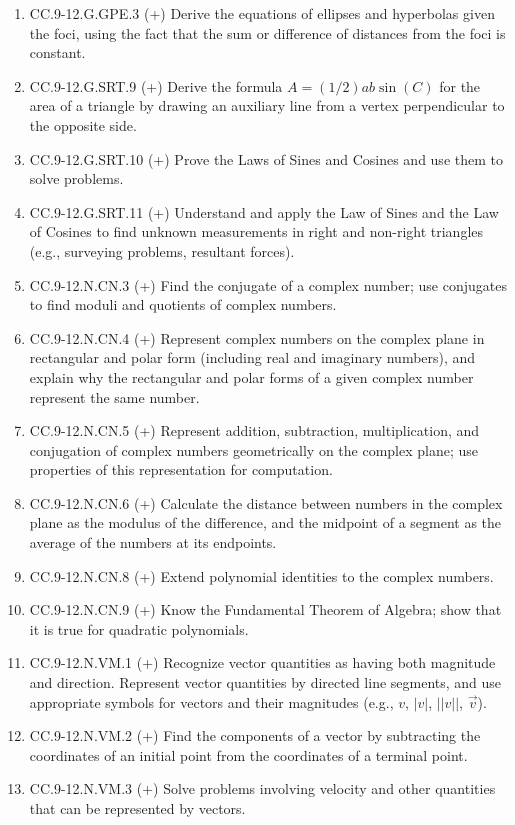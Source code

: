 \begin{enumerate}
	\item CC.9-12.G.GPE.3 (+)  Derive the equations of ellipses and hyperbolas given the foci, using the fact that the sum or difference of distances from the foci is constant.
	\item CC.9-12.G.SRT.9 (+)   Derive the formula $A = (1/2)ab \sin(C)$ for the area of a triangle by drawing an auxiliary line from a vertex perpendicular to the opposite side.
	\item CC.9-12.G.SRT.10 (+) Prove the Laws of Sines and Cosines and use them to solve problems.
	\item CC.9-12.G.SRT.11 (+)  Understand and apply the Law of Sines and the Law of Cosines to find unknown measurements in right and non-right triangles (e.g., surveying problems, resultant forces).
	\item CC.9-12.N.CN.3 (+)  Find the conjugate of a complex number; use conjugates to find moduli and quotients of complex numbers.
	\item CC.9-12.N.CN.4 (+) Represent complex numbers on the complex plane in rectangular and polar form (including real and imaginary numbers), and explain why the rectangular and polar forms of a given complex number represent the same number.
	\item CC.9-12.N.CN.5 (+) Represent addition, subtraction, multiplication, and conjugation of complex numbers geometrically on the complex plane; use properties of this representation for computation. 
	\item CC.9-12.N.CN.6 (+)  Calculate the distance between numbers in the complex plane as the modulus of the difference, and the midpoint of a segment as the average of the numbers at its endpoints.
	\item CC.9-12.N.CN.8 (+)  Extend polynomial identities to the complex numbers.
	\item CC.9-12.N.CN.9 (+)  Know the Fundamental Theorem of Algebra; show that it is true for quadratic polynomials.
	\item CC.9-12.N.VM.1 (+) Recognize vector quantities as having both magnitude and direction. Represent vector quantities by directed line segments, and use appropriate symbols for vectors and their magnitudes (e.g., \textbf{$v$}, $|$\textbf{$v$}$|$, $||$\textbf{$v$}$||$, $\vec{v}$).
	\item CC.9-12.N.VM.2 (+)  Find the components of a vector by subtracting the coordinates of an initial point from the coordinates of a terminal point.
	\item CC.9-12.N.VM.3 (+)   Solve problems involving velocity and other quantities that can be represented by vectors.

\end{enumerate}
